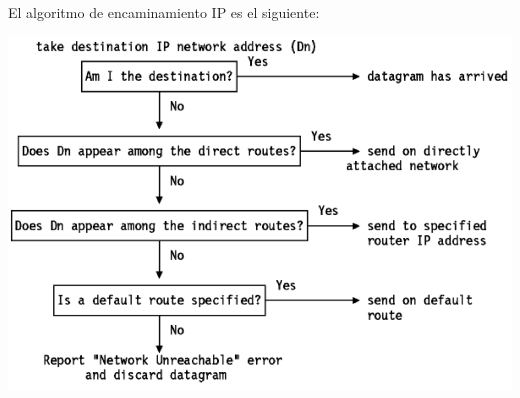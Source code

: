 \documentclass[10pt,portrait, twocolumn]{article}
\begin{document}
El algoritmo de encaminamiento IP es el siguiente:
	\begin{center}
		\includegraphics[scale = .5]{AlgoritmoIP}
	\end{center}


\hrulefill
	
	
	




\end{document}

